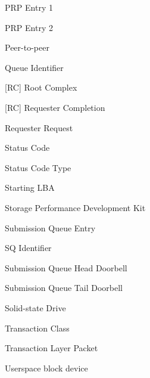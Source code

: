 \begin{acronym}[SQTDBLL]
    {PRP Entry 1}

    {PRP Entry 2}

    {Peer-to-peer}

    {Queue Identifier}

    [RC]
    {Root Complex}

    [RC]
    {Requester Completion}

    {Requester Request}

    {Status Code}

    {Status Code Type}

    {Starting LBA}

    {Storage Performance Development Kit}

    {Submission Queue Entry}

    {SQ Identifier}

    {Submission Queue Head Doorbell}

    {Submission Queue Tail Doorbell}

    {Solid-state Drive}

    {Transaction Class}

    {Transaction Layer Packet}

    {Userspace block device}
\end{acronym}
